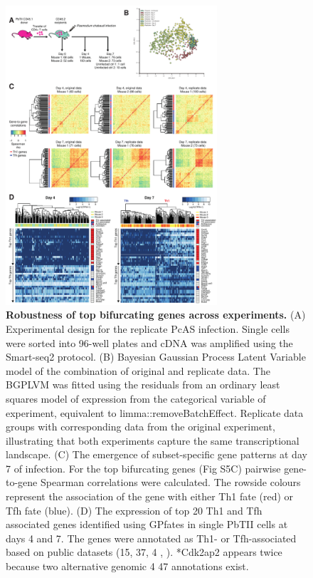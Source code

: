 \begin{figure}
    \centering
    \includegraphics[width=0.7\textwidth]{"Fig S12 rev3"}
    \caption[Robustness of top bifurcating genes across experiments]{\textbf{Robustness of top bifurcating genes across experiments.} (A) Experimental design for the replicate PcAS infection. Single cells were sorted into 96-well plates and cDNA was amplified using the Smart-seq2 protocol. (B) Bayesian Gaussian Process Latent Variable model of the combination of original and replicate data. The BGPLVM was fitted using the residuals from an ordinary least squares model of expression from the categorical variable of experiment, equivalent to limma::removeBatchEffect. Replicate data groups with corresponding data from the original experiment, illustrating that both experiments capture the same transcriptional landscape. (C) The emergence of subset-specific gene patterns at day 7 of infection. For the top bifurcating genes (Fig S5C) pairwise gene-to-gene Spearman correlations were calculated. The rowside colours represent the association of the gene with either Th1 fate (red) or Tfh fate (blue). (D) The expression of top 20 Th1 and Tfh associated genes identified using GPfates in single PbTII cells at days 4 and 7. The genes were annotated as Th1- or Tfh-associated based on public datasets (15, 37, 4 , ). *Cdk2ap2 appears twice because two alternative genomic 4 47 annotations exist.}
    \label{fig:ms12}
\end{figure}

